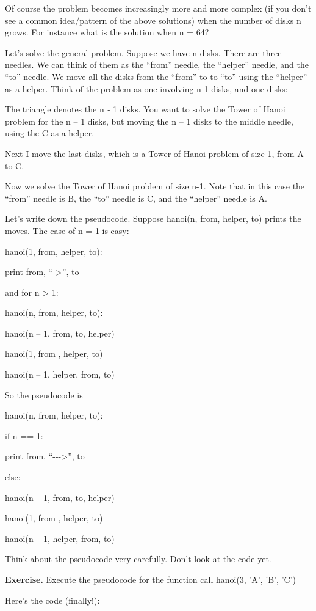 \documentclass[
]{article}
\begin{document}
Of course the problem becomes increasingly more and more complex (if you
don't see a common idea/pattern of the above solutions) when the number
of disks n grows. For instance what is the solution when n = 64?

Let's solve the general problem. Suppose we have n disks. There are
three needles. We can think of them as the ``from'' needle, the
``helper'' needle, and the ``to'' needle. We move all the disks from the
``from'' to to ``to'' using the ``helper'' as a helper. Think of the
problem as one involving n-1 disks, and one disks:

The triangle denotes the n \emph{- }1 disks. You want to solve the Tower
of Hanoi problem for the n -- 1 disks, but moving the n -- 1 disks to
the middle needle, using the C as a helper.

Next I move the last disks, which is a Tower of Hanoi problem of size 1,
from A to C.

Now we solve the Tower of Hanoi problem of size n-1. Note that in this
case the ``from'' needle is B, the ``to'' needle is C, and the
``helper'' needle is A.

Let's write down the pseudocode. Suppose hanoi(n, from, helper, to)
prints the moves. The case of n = 1 is easy:

hanoi(1, from, helper, to):

print from, ``-\textgreater'', to

and for n \textgreater{} 1:

hanoi(n, from, helper, to):

hanoi(n -- 1, from, to, helper)

hanoi(1, from , helper, to)

hanoi(n -- 1, helper, from, to)

So the pseudocode is

hanoi(n, from, helper, to):

if n == 1:

print from, ``-\/-\/-\textgreater'', to

else:

hanoi(n -- 1, from, to, helper)

hanoi(1, from , helper, to)

hanoi(n -- 1, helper, from, to)

Think about the pseudocode very carefully. Don't look at the code yet.

\textbf{Exercise.} Execute the pseudocode for the function call hanoi(3,
'A', 'B', 'C')

Here's the code (finally!):
\end{document}
